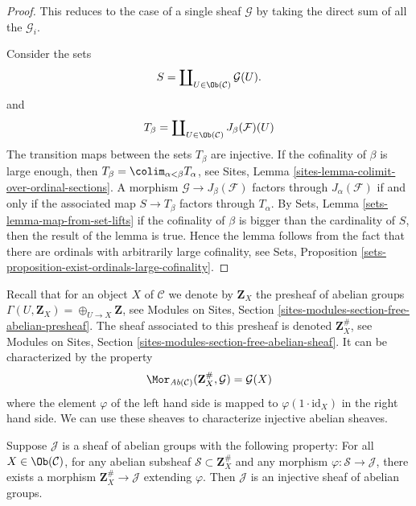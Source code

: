 \begin{proof}
This reduces to the case of a single sheaf $\mathcal{G}$
by taking the direct sum of all the $\mathcal{G}_i$.

\medskip\noindent
Consider the sets
$$
S = \coprod\nolimits_{U \in \Ob(\mathcal{C})} \mathcal{G}(U).
$$
and
$$
T_\beta
=
\coprod\nolimits_{U \in \Ob(\mathcal{C})} J_\beta(\mathcal{F})(U)
$$
The transition maps between the sets $T_\beta$ are injective.
If the cofinality of $\beta$ is large enough, then
$T_\beta = \colim_{\alpha < \beta} T_\alpha$, see
Sites, Lemma \ref{sites-lemma-colimit-over-ordinal-sections}.
A morphism $\mathcal{G} \to J_\beta(\mathcal{F})$ factors
through $J_\alpha(\mathcal{F})$ if and only if
the associated map $S \to T_\beta$ factors through $T_\alpha$.
By
Sets, Lemma \ref{sets-lemma-map-from-set-lifts}
if the cofinality of $\beta$ is bigger than the cardinality
of $S$, then the result of the lemma is true. Hence the lemma
follows from the fact that there are ordinals with arbitrarily
large cofinality, see
Sets, Proposition \ref{sets-proposition-exist-ordinals-large-cofinality}.
\end{proof}

\noindent
Recall that for an object $X$ of $\mathcal{C}$ we denote by $\mathbf{Z}_X$
the presheaf of abelian groups $\Gamma(U, \mathbf{Z}_X) =
\oplus_{U \to X} \mathbf{Z}$, see
Modules on Sites, Section \ref{sites-modules-section-free-abelian-presheaf}.
The sheaf associated to this presheaf
is denoted $\mathbf{Z}_X^\#$, see
Modules on Sites, Section \ref{sites-modules-section-free-abelian-sheaf}.
It can be characterized by
the property
\begin{equation}
\label{equation-free-sheaf-on}
\Mor_{\textit{Ab}(\mathcal{C})}(\mathbf{Z}_X^\#, \mathcal{G})
=
\mathcal{G}(X)
\end{equation}
where the element $\varphi$ of the left hand side is mapped
to $\varphi(1 \cdot \text{id}_X)$ in the right hand side. We can use these
sheaves to characterize injective abelian sheaves.

\begin{lemma}
\label{lemma-characterize-injectives}
Suppose $\mathcal{J}$ is a sheaf of abelian groups with the following
property: For all $X\in \Ob(\mathcal{C})$, for any abelian subsheaf
$\mathcal{S} \subset \mathbf{Z}_X^\#$ and any morphism
$\varphi : \mathcal{S} \to \mathcal{J}$, there exists a morphism
$\mathbf{Z}_X^\# \to \mathcal{J}$ extending $\varphi$.
Then $\mathcal{J}$ is an injective sheaf of abelian groups.
\end{lemma}

